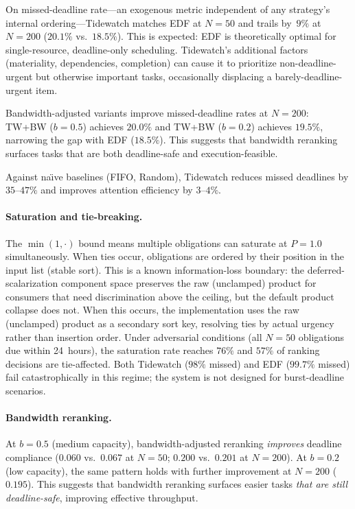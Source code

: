 \documentclass[11pt]{article}
\begin{document}
On missed-deadline rate---an exogenous metric independent of any
strategy's internal ordering---Tidewatch matches EDF at $N{=}50$ and
trails by~$9\%$ at $N{=}200$ ($20.1\%$ vs.\ $18.5\%$).  This is
expected: EDF is theoretically optimal for single-resource,
deadline-only scheduling.  Tidewatch's additional factors
(materiality, dependencies, completion) can cause it to prioritize
non-deadline-urgent but otherwise important tasks, occasionally
displacing a barely-deadline-urgent item.

Bandwidth-adjusted variants improve missed-deadline rates at
$N{=}200$: TW+BW ($b{=}0.5$) achieves $20.0\%$ and TW+BW ($b{=}0.2$)
achieves $19.5\%$, narrowing the gap with EDF ($18.5\%$).  This
suggests that bandwidth reranking surfaces tasks that are both
deadline-safe and execution-feasible.

Against na\"{\i}ve baselines (FIFO, Random), Tidewatch reduces
missed deadlines by $35$--$47\%$ and improves attention efficiency
by $3$--$4\%$.

\paragraph{Saturation and tie-breaking.}
The $\min(1, \cdot)$ bound means multiple obligations can saturate at
$P = 1.0$ simultaneously.  When ties occur, obligations are ordered by
their position in the input list (stable sort).  This is a known
information-loss boundary: the deferred-scalarization component space
preserves the raw (unclamped) product for consumers that need
discrimination above the ceiling, but the default product collapse
does not.  When this occurs, the implementation uses the raw
(unclamped) product as a secondary sort key, resolving ties by
actual urgency rather than insertion order.
Under adversarial conditions (all $N{=}50$ obligations due within
24~hours), the saturation rate reaches $76\%$ and $57\%$ of
ranking decisions are tie-affected.  Both Tidewatch ($98\%$
missed) and EDF ($99.7\%$ missed) fail catastrophically in this
regime; the system is not designed for burst-deadline scenarios.

\paragraph{Bandwidth reranking.}
At $b = 0.5$ (medium capacity), bandwidth-adjusted reranking
\emph{improves} deadline compliance ($0.060$ vs.\ $0.067$ at
$N{=}50$; $0.200$ vs.\ $0.201$ at $N{=}200$).
At $b = 0.2$ (low capacity), the same pattern holds with further
improvement at $N{=}200$ ($0.195$).
This suggests that bandwidth reranking surfaces easier tasks \emph{that
are still deadline-safe}, improving effective throughput.
\end{document}
